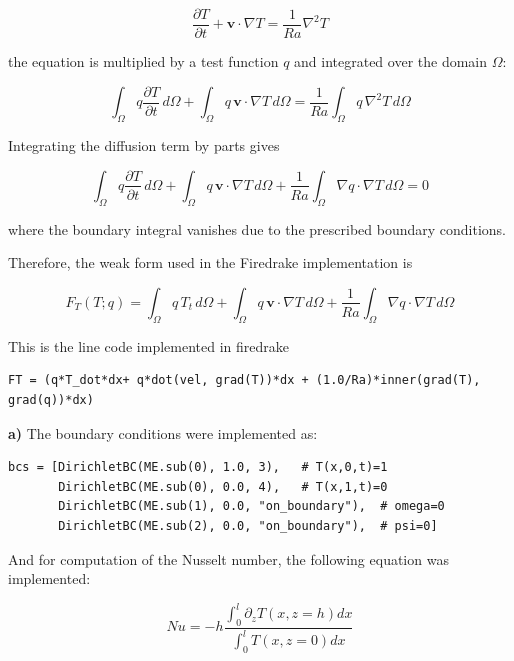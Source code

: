 \documentclass[12pt]{article}
\begin{document}
\begin{equation}
\frac{\partial T}{\partial t}
+
\mathbf{v}\cdot\nabla T
=
\frac{1}{Ra}\nabla^2 T
\end{equation}

the equation is multiplied by a test function $q$ and integrated over the domain $\Omega$:

\begin{equation}
\int_\Omega
q \frac{\partial T}{\partial t}\, d\Omega
+
\int_\Omega
q\, \mathbf{v}\cdot\nabla T\, d\Omega
=
\frac{1}{Ra}
\int_\Omega
q\, \nabla^2 T\, d\Omega
\end{equation}

Integrating the diffusion term by parts gives

\begin{equation}
\int_\Omega
q \frac{\partial T}{\partial t}\, d\Omega
+
\int_\Omega
q\, \mathbf{v}\cdot\nabla T\, d\Omega
+
\frac{1}{Ra}
\int_\Omega
\nabla q \cdot \nabla T\, d\Omega
=0
\end{equation}

where the boundary integral vanishes due to the prescribed boundary conditions.

Therefore, the weak form used in the Firedrake implementation is

\begin{equation}
F_T(T;q)
=
\int_\Omega
q\, T_t\, d\Omega
+
\int_\Omega
q\, \mathbf{v}\cdot\nabla T\, d\Omega
+
\frac{1}{Ra}
\int_\Omega
\nabla q \cdot \nabla T\, d\Omega
\end{equation}

This is the line code implemented in firedrake

\begin{lstlisting}
FT = (q*T_dot*dx+ q*dot(vel, grad(T))*dx + (1.0/Ra)*inner(grad(T), grad(q))*dx)
\end{lstlisting}
\textbf{a)} The boundary conditions were implemented as:

\begin{lstlisting}
bcs = [DirichletBC(ME.sub(0), 1.0, 3),   # T(x,0,t)=1
       DirichletBC(ME.sub(0), 0.0, 4),   # T(x,1,t)=0
       DirichletBC(ME.sub(1), 0.0, "on_boundary"),  # omega=0
       DirichletBC(ME.sub(2), 0.0, "on_boundary"),  # psi=0]
\end{lstlisting}

And for computation of the Nusselt number, the following equation was implemented:

\begin{equation}
    Nu = -h\frac{\int_0^l\partial_z T(x, z=h)dx}{\int_0^l T(x, z=0)dx}
\end{equation}
\end{document}
